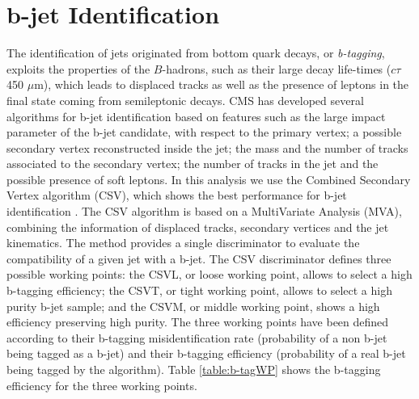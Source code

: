 \section{b-jet Identification}
\label{sec:bJet}

The identification of jets originated from bottom quark decays, or \textit{b-tagging}, exploits 
the properties of the $B$-hadrons, such as their large decay life-times ($c\tau~$450 $\mu$m), which 
leads to displaced tracks as well as the presence of leptons in the final state 
coming from semileptonic decays. CMS has developed several algorithms for b-jet 
identification \cite{bjetID} based on features such as the large 
impact parameter of the b-jet candidate, with respect to the primary vertex;
a possible secondary vertex reconstructed inside the jet; the mass
and the number of tracks associated to the secondary vertex; the number of tracks in 
the jet and the possible presence of soft leptons. In this analysis we use the 
Combined Secondary Vertex algorithm (CSV), which shows the best 
performance for b-jet identification \cite{bjetperformance}. The CSV algorithm is based on a 
MultiVariate Analysis (MVA), combining the information
of  displaced tracks, secondary vertices and the jet kinematics. The method
provides a single discriminator to evaluate the compatibility of a given jet 
with a b-jet. The CSV discriminator defines three possible working points:
the CSVL, or loose working point, allows to select a high 
b-tagging efficiency; the CSVT, or tight working point, 
allows to select a high purity b-jet sample; and 
the CSVM, or middle working point, shows a high efficiency preserving 
high purity. The three working points have been defined 
according to their b-tagging misidentification rate (probability of a non b-jet being 
tagged as a b-jet) and their b-tagging efficiency (probability of a real b-jet being tagged 
by the algorithm). Table \ref{table:b-tagWP} shows the b-tagging efficiency for the three working points.\\

